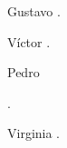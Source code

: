 \begin{opin}{\guscolor}{Gustavo}
.


\end{opin}

\begin{opin}{\victorcolor}{Víctor}
.


\end{opin}

\begin{opin}{\pedrocolor}{Pedro}

.


\end{opin}

\begin{opin}{\virgicolor}{Virginia}
.


\end{opin}
